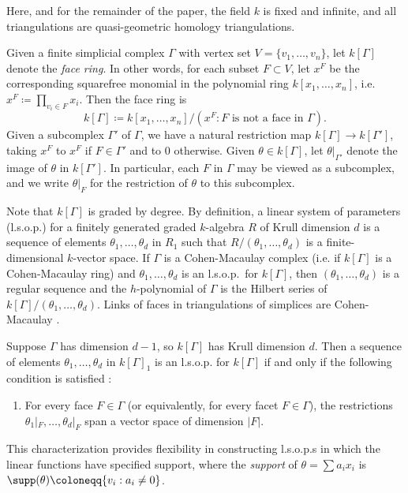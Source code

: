Here, and for the remainder of the paper, the field $k$ is fixed and infinite, and all triangulations are quasi-geometric homology triangulations.

 Given a finite simplicial complex $\Gamma$ with vertex set $V = \{v_1, \ldots, v_n\}$, let $k[\Gamma]$ denote the \emph{face ring}. In other words, for each subset $F \subset V$, let $x^F$ be the corresponding squarefree monomial in the polynomial ring $k[x_1, \ldots, x_n]$, i.e.
 $
 x^F \coloneqq  \prod_{v_i \in F} x_i.
 $ 
 Then the face ring is
 \[
 k[\Gamma]  \coloneqq  k[x_1, \ldots, x_n] / (x^F : F \mbox{ is not a face in } \Gamma).
 \]
Given a subcomplex $\Gamma'$ of $\Gamma$, we have a natural restriction map $k[\Gamma] \rightarrow  k[\Gamma']$, taking $x^F$ to $x^F$ if $F \in \Gamma'$ and to 0 otherwise. Given $\theta \in k[\Gamma]$, let $\theta|_{\Gamma'}$ denote the image of $\theta$ in $k[\Gamma']$. In particular, each $F$ in $\Gamma$ may be viewed as a subcomplex, and we write $\theta|_F$ for the restriction of $\theta$ to this subcomplex.

Note that $k[\Gamma]$ is graded by degree. By definition, a linear system of parameters (l.s.o.p.) for a finitely generated graded $k$-algebra $R$ of Krull dimension $d$ is a sequence of elements $\theta_1, \ldots, \theta_d$ in $R_1$ such that $R/(\theta_1, \ldots, \theta_d)$ is a finite-dimensional $k$-vector space. If $\Gamma$ is a Cohen-Macaulay complex (i.e. if $k[\Gamma]$ is a Cohen-Macaulay ring) and $\theta_1, \ldots, \theta_d$ is an l.s.o.p.\ for $k[\Gamma]$, then $(\theta_1, \ldots, \theta_d)$ is a regular sequence and the $h$-polynomial of $\Gamma$ is the Hilbert series of $k[\Gamma]/(\theta_1, \ldots, \theta_d)$.  Links of faces in triangulations of simplices are Cohen-Macaulay \cite{Reisner76}. 

Suppose $\Gamma$ has dimension $d-1$, so $k[\Gamma]$ has Krull dimension $d$.  Then a sequence of elements $\theta_1, \ldots, \theta_d$ in $k[\Gamma]_1$ is an l.s.o.p. for $k[\Gamma]$ if and only if the following condition is satisfied \cite[Lemma~2.4(a)]{Stanley96}:


\begin{enumerate}[label=(*)]
\item \label{it1} For every face $F \in \Gamma$ (or equivalently, for every facet $F \in \Gamma$), the restrictions $\theta_1|_F, \ldots, \theta_d|_F$ span a vector space of dimension $|F|$. 
\end{enumerate}

This characterization provides flexibility in constructing l.s.o.p.s in which the linear functions have specified support, where the \emph{support} of $\theta = \sum a_i x_i$ is $\supp(\theta)  \coloneqq  \{ v_i : a_i \neq 0 \}$.

